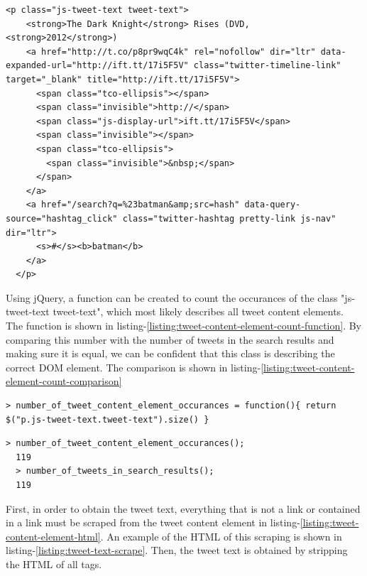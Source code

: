 \begin{lstlisting}[caption={HTML of the tweet content element in a tweet},label={listing:tweet-content-element-html},captionpos=b]
  <p class="js-tweet-text tweet-text">
    <strong>The Dark Knight</strong> Rises (DVD, <strong>2012</strong>)
    <a href="http://t.co/p8pr9wqC4k" rel="nofollow" dir="ltr" data-expanded-url="http://ift.tt/17i5F5V" class="twitter-timeline-link" target="_blank" title="http://ift.tt/17i5F5V">
      <span class="tco-ellipsis"></span>
      <span class="invisible">http://</span>
      <span class="js-display-url">ift.tt/17i5F5V</span>
      <span class="invisible"></span>
      <span class="tco-ellipsis">
        <span class="invisible">&nbsp;</span>
      </span>
    </a>
    <a href="/search?q=%23batman&amp;src=hash" data-query-source="hashtag_click" class="twitter-hashtag pretty-link js-nav" dir="ltr">
      <s>#</s><b>batman</b>
    </a>
  </p>
\end{lstlisting}

\noindent
Using jQuery, a function can be created to count the occurances of the class "js-tweet-text tweet-text", which most likely describes all tweet content elements. The function is shown in listing-\ref{listing:tweet-content-element-count-function}. By comparing this number with the number of tweets in the search results and making sure it is equal, we can be confident that this class is describing the correct DOM element. The comparison is shown in
listing-\ref{listing:tweet-content-element-count-comparison}

\begin{lstlisting}[caption={Creating a function in GCDT Javascript Console for counting the occurance of tweet content elements on the twitter search result page},label={listing:tweet-content-element-count-function},captionpos=b]
  > number_of_tweet_content_element_occurances = function(){ return $("p.js-tweet-text.tweet-text").size() }
\end{lstlisting}

\begin{lstlisting}[caption={Running functions in GCDT Javascript Console to show that the number of tweet content elements matches the number of tweets},label={listing:tweet-content-element-count-comparison},captionpos=b]
  > number_of_tweet_content_element_occurances();
  119
  > number_of_tweets_in_search_results();
  119
\end{lstlisting}

\noindent
First, in order to obtain the tweet text, everything that is not a link or contained in a link must be scraped from the tweet content element in listing-\ref{listing:tweet-content-element-html}. An example of the HTML of this scraping is shown in listing-\ref{listing:tweet-text-scrape}. Then, the tweet text is obtained by stripping the HTML of all tags.

